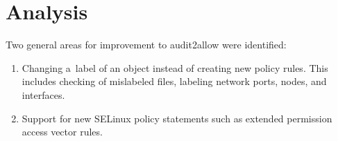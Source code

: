 
\chapter{Analysis}
\label{analysis}
Two general areas for improvement to audit2allow were identified:
\begin{enumerate}
    \item Changing a~label of an object instead of creating new policy rules.
        This includes checking of mislabeled files, labeling network ports,
        nodes, and interfaces.
    \item Support for new SELinux policy statements such as extended permission
        access vector rules.
\end{enumerate}

